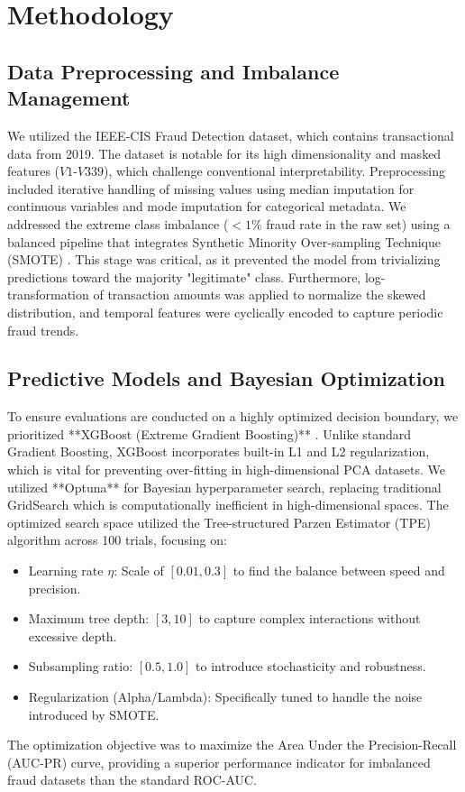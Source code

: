 \documentclass[conference]{IEEEtran}
\begin{document}
\section{Methodology}
\subsection{Data Preprocessing and Imbalance Management}
We utilized the IEEE-CIS Fraud Detection dataset, which contains transactional data from 2019. The dataset is notable for its high dimensionality and masked features ($V1$-$V339$), which challenge conventional interpretability. Preprocessing included iterative handling of missing values using median imputation for continuous variables and mode imputation for categorical metadata. We addressed the extreme class imbalance ($<1\%$ fraud rate in the raw set) using a balanced pipeline that integrates Synthetic Minority Over-sampling Technique (SMOTE) \cite{b6}. This stage was critical, as it prevented the model from trivializing predictions toward the majority "legitimate" class. Furthermore, log-transformation of transaction amounts was applied to normalize the skewed distribution, and temporal features were cyclically encoded to capture periodic fraud trends.

\subsection{Predictive Models and Bayesian Optimization}
To ensure evaluations are conducted on a highly optimized decision boundary, we prioritized **XGBoost (Extreme Gradient Boosting)** \cite{b13}. Unlike standard Gradient Boosting, XGBoost incorporates built-in L1 and L2 regularization, which is vital for preventing over-fitting in high-dimensional PCA datasets. We utilized **Optuna** \cite{b10} for Bayesian hyperparameter search, replacing traditional GridSearch which is computationally inefficient in high-dimensional spaces. The optimized search space utilized the Tree-structured Parzen Estimator (TPE) algorithm across 100 trials, focusing on:
\begin{itemize}
    \item Learning rate $\eta$: Scale of $[0.01, 0.3]$ to find the balance between speed and precision.
    \item Maximum tree depth: $[3, 10]$ to capture complex interactions without excessive depth.
    \item Subsampling ratio: $[0.5, 1.0]$ to introduce stochasticity and robustness.
    \item Regularization (Alpha/Lambda): Specifically tuned to handle the noise introduced by SMOTE.
\end{itemize}
The optimization objective was to maximize the Area Under the Precision-Recall (AUC-PR) curve, providing a superior performance indicator for imbalanced fraud datasets than the standard ROC-AUC.
\end{document}
